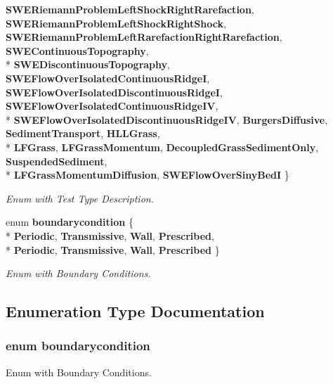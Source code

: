 \begin{DoxyCompactItemize}
{\bf S\-W\-E\-Riemann\-Problem\-Left\-Shock\-Right\-Rarefaction}, 
{\bf S\-W\-E\-Riemann\-Problem\-Left\-Shock\-Right\-Shock}, 
{\bf S\-W\-E\-Riemann\-Problem\-Left\-Rarefaction\-Right\-Rarefaction}, 
{\bf S\-W\-E\-Continuous\-Topography}, 
\\*
{\bf S\-W\-E\-Discontinuous\-Topography}, 
{\bf S\-W\-E\-Flow\-Over\-Isolated\-Continuous\-Ridge\-I}, 
{\bf S\-W\-E\-Flow\-Over\-Isolated\-Discontinuous\-Ridge\-I}, 
{\bf S\-W\-E\-Flow\-Over\-Isolated\-Continuous\-Ridge\-I\-V}, 
\\*
{\bf S\-W\-E\-Flow\-Over\-Isolated\-Discontinuous\-Ridge\-I\-V}, 
{\bf Burgers\-Diffusive}, 
{\bf Sediment\-Transport}, 
{\bf H\-L\-L\-Grass}, 
\\*
{\bf L\-F\-Grass}, 
{\bf L\-F\-Grass\-Momentum}, 
{\bf Decoupled\-Grass\-Sediment\-Only}, 
{\bf Suspended\-Sediment}, 
\\*
{\bf L\-F\-Grass\-Momentum\-Diffusion}, 
{\bf S\-W\-E\-Flow\-Over\-Siny\-Bed\-I}
 \}
\begin{DoxyCompactList}\small\item\em Enum with Test Type Description. \end{DoxyCompactList}\item 
enum {\bf boundarycondition} \{ \\*
{\bf Periodic}, 
{\bf Transmissive}, 
{\bf Wall}, 
{\bf Prescribed}, 
\\*
{\bf Periodic}, 
{\bf Transmissive}, 
{\bf Wall}, 
{\bf Prescribed}
 \}
\begin{DoxyCompactList}\small\item\em Enum with Boundary Conditions. \end{DoxyCompactList}\end{DoxyCompactItemize}


\subsection{Enumeration Type Documentation}
\subsubsection[{boundarycondition}]{\setlength{\rightskip}{0pt plus 5cm}enum {\bf boundarycondition}}\label{enumtypes_8h_a8417eaee8c90ff931dfc45f62364e84b}


Enum with Boundary Conditions. 


